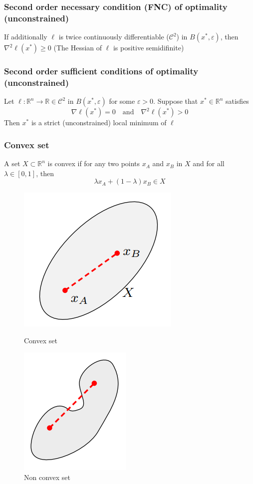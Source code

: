 \documentclass[openany]{book}
\newcommand{\R}{\mathbb{R}} %
\theoremstyle{definition}
\theoremstyle{remark}
\begin{document}
\subsubsection{Second order necessary condition (FNC) of optimality (unconstrained)}
If additionally $\ell$ is twice continuously differentiable ($\mathcal{C}^2$) in $B(x^*,\varepsilon)$, then $\nabla^2 \ell(x^*)\geq 0$ (The Hessian of $\ell$ is positive semidifinite)
\subsubsection{Second order sufficient conditions of optimality (unconstrained)}
Let $\ell:\R^n\to\R\in\mathcal{C}^2$ in $B(x^*,\varepsilon)$ for some $\varepsilon>0$. Suppose that $x^*\in\R^n$ satisfies 
\[
    \nabla\ell(x^*) = 0\quad \text{and} \quad \nabla^2\ell(x^*)>0
\]
Then $x^*$ is a strict (unconstrained) local minimum of $\ell$
\subsubsection{Convex set} 
A set $X\subset \R^n$ is convex if for any two points $x_A$ and $x_B$ in $X$ and for all $\lambda\in[0,1]$, then 
\[
    \lambda x_A + (1-\lambda)x_B \in X
\]
\begin{figure}[ht]
    \centering
    \begin{minipage}{.5\textwidth}
        \centering
        \includegraphics[width=0.4\linewidth]{cvxset}
    \caption{Convex set}
    \end{minipage}%
    \begin{minipage}{.5\textwidth}
        \centering
        \includegraphics[width=0.4\linewidth]{ncvxset}
    \caption{Non convex set}
    \end{minipage}
\end{figure}
\end{document}

